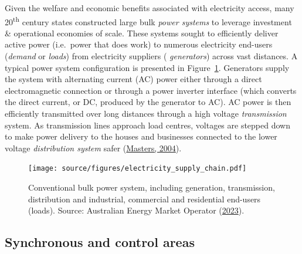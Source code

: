 \documentclass[12pt,a4paper,]{report}
\begin{document}
Given the welfare and economic benefits associated with electricity
access, many 20\textsuperscript{th} century states constructed large
bulk \emph{power systems} to leverage investment \& operational
economies of scale. These systems sought to efficiently deliver active
power (i.e.~power that does work) to numerous electricity end-users
(\emph{demand} or \emph{loads}) from electricity suppliers (
\emph{generators}) across vast distances. A typical power system
configuration is presented in Figure~\ref{fig:elec_supply_chain}.
Generators supply the system with alternating current (AC) power either
through a direct electromagnetic connection or through a power inverter
interface (which converts the direct current, or DC, produced by the
generator to AC). AC power is then efficiently transmitted over long
distances through a high voltage \emph{transmission} system. As
transmission lines approach load centres, voltages are stepped down to
make power delivery to the houses and businesses connected to the lower
voltage \emph{distribution system} safer
(\protect\hyperlink{ref-mastersRenewableEfficientElectric2004}{Masters,
2004}).

\begin{figure}
\hypertarget{fig:elec_supply_chain}{%
\centering
\texttt{[image: source/figures/electricity\_supply\_chain.pdf]}
\caption[The bulk power system as an electricity supply
chain]{Conventional bulk power system, including generation,
transmission, distribution and industrial, commercial and residential
end-users (loads). Source: Australian Energy Market Operator
(\protect\hyperlink{ref-australianenergymarketoperatorIndustryOverview2023}{2023}).}\label{fig:elec_supply_chain}
}
\end{figure}

\hypertarget{synchronous-and-control-areas}{%
\subsection{Synchronous and control
areas}\label{synchronous-and-control-areas}}
\end{document}
